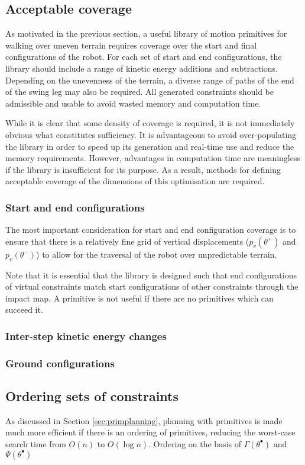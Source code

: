 \subsection{Acceptable coverage}
As motivated in the previous section, a useful library of motion primitives for walking over uneven terrain requires coverage over the start and final configurations of the robot. For each set of start and end configurations, the library should include a range of kinetic energy additions and subtractions. Depending on the unevenness of the terrain, a diverse range of paths of the end of the swing leg may also be required. All generated constraints should be admissible and usable to avoid wasted memory and computation time.

While it is clear that some density of coverage is required, it is not immediately obvious what constitutes sufficiency. It is advantageous to avoid over-populating the library in order to speed up its generation and real-time use and reduce the memory requirements. However, advantages in computation time are meaningless if the library is insufficient for its purpose. As a result, methods for defining acceptable coverage of the dimensions of this optimisation are required.

\subsubsection{Start and end configurations}
The most important consideration for start and end configuration coverage is to ensure that there is a relatively fine grid of vertical displacements ($p_v(\theta^+)$ and $p_v(\theta^-)$) to allow for the traversal of the robot over unpredictable terrain. 

Note that it is essential that the library is designed such that end configurations of virtual constraints match start configurations of other constraints through the impact map. A primitive is not useful if there are no primitives which can succeed it.

\subsubsection{Inter-step kinetic energy changes}

\subsubsection{Ground configurations}

\subsection{Ordering sets of constraints}
As discussed in Section \ref{sec:primplanning}, planning with primitives is made much more efficient if there is an ordering of primitives, reducing the worst-case search time from $O(n)$ to $O(\log n)$. Ordering on the basis of $\Gamma(\theta^\bullet)$ and $\Psi(\theta^\bullet)$

